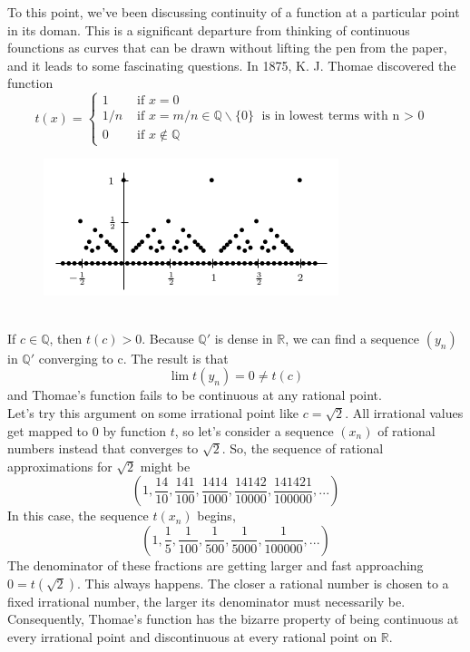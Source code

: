 \documentclass[12pt]{article}
\begin{document}
\quad To this point, we've been discussing continuity of a function at a particular point in its doman. This is a significant departure from thinking of continuous founctions as curves that can be drawn without lifting the pen from the paper, and it leads to some fascinating questions. In 1875, K. J. Thomae discovered the function
\begin{equation*}
    t(x) = 
    \begin{cases}
        1 & \text{ if } x = 0 \\
        1/n & \text{ if } x = m/n \in \mathbb{Q}\backslash \{0\} \text{ is in lowest terms with n $>$ 0 } \\
        0 & \text{ if } x \notin \mathbb{Q}
    \end{cases}
\end{equation*}
\begin{figure}[ht]
    \centering
    \includegraphics[scale=0.5]{Thomae.png}
\end{figure} \\
If $c \in \mathbb{Q}$, then $t(c) > 0$. Because $\mathbb{Q}'$ is dense in $\mathbb{R}$, we can find a sequence $(y_n)$ in $\mathbb{Q}'$ converging to c. The result is that \[
    \lim t(y_n) = 0 \neq t(c)
\]
and Thomae's function fails to be continuous at any rational point.\\
Let's try this argument on some irrational point like $c=\sqrt{2}$. All irrational values get mapped to $0$ by function $t$, so let's consider a sequence $(x_n)$ of rational numbers instead that converges to $\sqrt{2}$. So, the sequence of rational approximations for $\sqrt{2}$ might be \[
    \left( 1, \frac{14}{10}, \frac{141}{100}, \frac{1414}{1000}, \frac{14142}{10000}, \frac{141421}{100000}, ... \right)
\]
In this case, the sequence $t(x_n)$ begins, \[
    \left( 1, \frac{1}{5}, \frac{1}{100}, \frac{1}{500}, \frac{1}{5000}, \frac{1}{100000}, ... \right)
\]
The denominator of these fractions are getting larger and fast approaching $0 = t(\sqrt{2})$. This always happens. The closer a rational number is chosen to a fixed irrational number, the larger its denominator must necessarily be. Consequently, Thomae's function has the bizarre property of being continuous at every irrational point and discontinuous at every rational point on $\mathbb{R}$. \\
\end{document}
